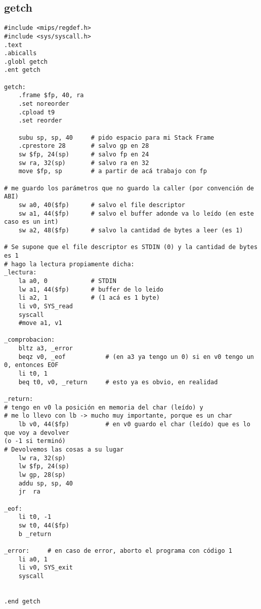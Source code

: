 \documentclass[a4paper,11pt]{article}
\begin{document}
\subsection{getch}
\begin{verbatim}
#include <mips/regdef.h>
#include <sys/syscall.h>
.text
.abicalls
.globl getch
.ent getch

getch:
	.frame $fp, 40, ra
	.set noreorder
	.cpload t9
	.set reorder

	subu sp, sp, 40 	# pido espacio para mi Stack Frame
	.cprestore 28		# salvo gp en 28
	sw $fp, 24(sp)		# salvo fp en 24
	sw ra, 32(sp)		# salvo ra en 32
	move $fp, sp		# a partir de acá trabajo con fp

# me guardo los parámetros que no guardo la caller (por convención de ABI)
	sw a0, 40($fp)		# salvo el file descriptor
	sw a1, 44($fp)		# salvo el buffer adonde va lo leído (en este caso es un int)
	sw a2, 48($fp)		# salvo la cantidad de bytes a leer (es 1)

# Se supone que el file descriptor es STDIN (0) y la cantidad de bytes es 1
# hago la lectura propiamente dicha:
_lectura:
	la a0, 0			# STDIN
	lw a1, 44($fp) 		# buffer de lo leido
	li a2, 1			# (1 acá es 1 byte)
	li v0, SYS_read
	syscall
	#move a1, v1

_comprobacion:
	bltz a3, _error		
	beqz v0, _eof			# (en a3 ya tengo un 0) si en v0 tengo un 0, entonces EOF
	li t0, 1
	beq t0, v0, _return		# esto ya es obvio, en realidad

_return:
# tengo en v0 la posición en memoria del char (leído) y
# me lo llevo con lb -> mucho muy importante, porque es un char
	lb v0, 44($fp)			# en v0 guardo el char (leído) que es lo que voy a devolver 
(o -1 si terminó)
# Devolvemos las cosas a su lugar
	lw ra, 32(sp)
	lw $fp, 24(sp)
	lw gp, 28(sp)
	addu sp, sp, 40
	jr	ra

_eof:
	li t0, -1
	sw t0, 44($fp)
	b _return

_error:		# en caso de error, aborto el programa con código 1
	li a0, 1
	li v0, SYS_exit
	syscall


.end getch
\end{verbatim}
\end{document}
